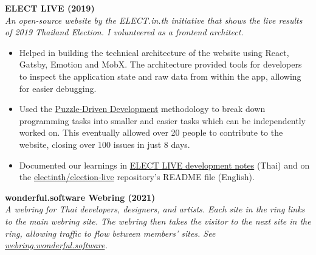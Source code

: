 \documentclass[a4paper]{article}
\newcommand{\github} [1] {\href{https://github.com/#1}{#1}}
\begin{document}
\vspace{2mm}

\textbf{ELECT LIVE (2019)}\\
\textit{An open-source website by the ELECT.in.th initiative that shows the live results of 2019 Thailand Election. I volunteered as a frontend architect.}

\begin{itemize} \itemsep 1pt
    
	\item Helped in building the technical architecture of the website using React, Gatsby, Emotion and MobX. The architecture provided tools for developers to inspect the application state and raw data from within the app, allowing for easier debugging.
    
	\item Used the \href{https://www.yegor256.com/2010/03/04/pdd.html}{Puzzle-Driven Development} methodology to break down programming tasks into smaller and easier tasks which can be independently worked on. This eventually allowed over 20 people to contribute to the website, closing over 100 issues in just 8 days.
    
	\item Documented our learnings in \href{https://wonderful.software/elect-live/}{ELECT LIVE development notes} (Thai) and on the \github{electinth/election-live} repository’s README file (English).
    
\end{itemize}

\vspace{2mm}

\textbf{wonderful.software Webring (2021)}\\
\textit{A webring for Thai developers, designers, and artists. Each site in the ring links to the main webring site. The webring then takes the visitor to the next site in the ring, allowing traffic to flow between members’ sites. See \href{https://webring.wonderful.software/}{webring.wonderful.software}.}
\end{document}
